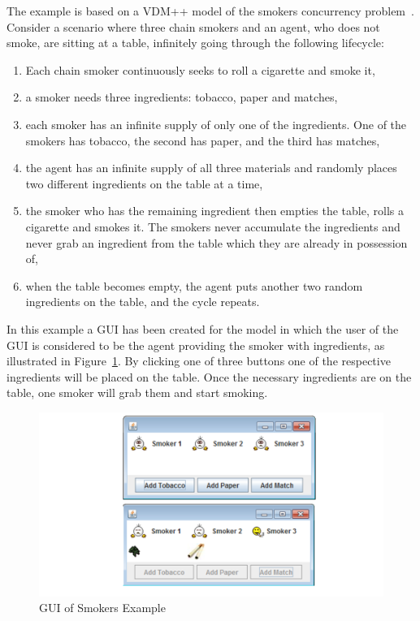 \documentclass{overturerepchap}
\begin{document}
The example is based on a VDM++ model of the smokers concurrency problem~\cite{Patil71}. Consider a scenario where three chain smokers and an agent, who does not smoke, are sitting at a table, infinitely going through the following lifecycle:
\begin{enumerate}
\item Each chain smoker continuously seeks to roll a cigarette and  smoke it,
\item a smoker needs three ingredients: tobacco, paper and matches,
\item each smoker has an infinite supply of only one of the ingredients.
One of the smokers has tobacco, the second has paper, and the third has
matches,
\item the agent has an infinite supply of all three materials and randomly places two different ingredients on the table at a time,
\item the smoker who has the remaining ingredient then empties the table, rolls a cigarette and smokes it. The smokers never accumulate the ingredients and never grab an ingredient from the table which they are already in possession of,
\item when the table becomes empty, the agent puts another two random ingredients on the table, and the
cycle repeats.
\end{enumerate}

In this example a GUI has been created for the model in which the user of the GUI is considered to be the agent providing the smoker with ingredients, as illustrated in Figure~\ref{fig:gui:SmokersGUI}.  By clicking one of three buttons one of the respective ingredients will be placed on the table. Once the necessary ingredients are on the table, one smoker will grab them and start smoking.

\begin{figure}[!h]
\begin{center}
  \includegraphics[width=\textwidth]{figures/smokersGUI}
  \caption[labelInTOC]{GUI of Smokers Example}
  \label{fig:gui:SmokersGUI}
\end{center}
\end{figure}
\end{document}
